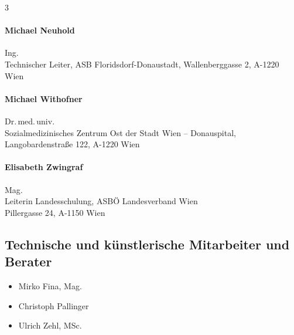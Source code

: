 \begin{WidePar}
\begin{raggedright}
\begin{multicols}{3}
  \bigskip

  \begin{minipage}{\linewidth}\raggedright
    \paragraph{Michael Neuhold}
    Ing.\\[.25\baselineskip]
    Technischer Leiter, {\color{AltBlueDark}ASB Florids\-dorf-Donau\-stadt},
    Wallenberggasse 2, A-1220 Wien
  \end{minipage}

  \bigskip

  \begin{minipage}{\linewidth}\raggedright
    \paragraph{Michael Withofner}
    Dr.\,med.\,univ.\\[.25\baselineskip]
    {\color{AltBlueDark}Sozialmedizinisches Zentrum Ost der Stadt Wien --
    Donauspital}, Langobardenstra{\ss}e 122, A-1220 Wien
  \end{minipage}

  \bigskip

  \begin{minipage}{\linewidth}\raggedright
    \paragraph{Elisabeth Zwingraf}
    Mag. \\[.25\baselineskip]
    Leiterin Landesschulung, {\color{AltBlueDark}ASBÖ Landesverband Wien}\\
    Pillergasse 24, A-1150 Wien
  \end{minipage}



\end{multicols}


\subsection*{Technische und künstlerische Mitarbeiter und
Berater}

{\FontSansNarrowFamily\small
\begin{itemize}\CorrectionListsBox
  \item Mirko Fina, Mag.
  \item Christoph Pallinger
  \item Ulrich Zehl, MSc.
\end{itemize}
}


\end{raggedright}
\end{WidePar}
